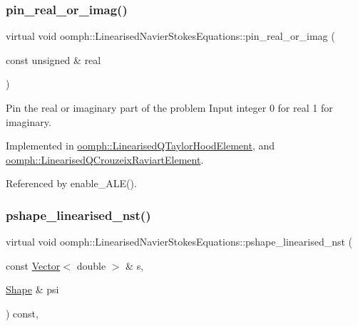 \subsubsection{\texorpdfstring{pin\+\_\+real\+\_\+or\+\_\+imag()}{pin\_real\_or\_imag()}}
{\footnotesize\ttfamily virtual void oomph\+::\+Linearised\+Navier\+Stokes\+Equations\+::pin\+\_\+real\+\_\+or\+\_\+imag (\begin{DoxyParamCaption}\item[{const unsigned \&}]{real }\end{DoxyParamCaption})\hspace{0.3cm}{\ttfamily [pure virtual]}}



Pin the real or imaginary part of the problem Input integer 0 for real 1 for imaginary. 



Implemented in \hyperlink{classoomph_1_1LinearisedQTaylorHoodElement_a84bb4ee14849c6ed91b0005b1c9b06dc}{oomph\+::\+Linearised\+Q\+Taylor\+Hood\+Element}, and \hyperlink{classoomph_1_1LinearisedQCrouzeixRaviartElement_ab6ffe74e04be87be8e1fdf6a58215edb}{oomph\+::\+Linearised\+Q\+Crouzeix\+Raviart\+Element}.



Referenced by enable\+\_\+\+A\+L\+E().

\mbox{\label{classoomph_1_1LinearisedNavierStokesEquations_a6158d0cdb646491170e4b75abfc88538}} 
\subsubsection{\texorpdfstring{pshape\+\_\+linearised\+\_\+nst()}{pshape\_linearised\_nst()}\hspace{0.1cm}{\footnotesize\ttfamily [1/2]}}
{\footnotesize\ttfamily virtual void oomph\+::\+Linearised\+Navier\+Stokes\+Equations\+::pshape\+\_\+linearised\+\_\+nst (\begin{DoxyParamCaption}\item[{const \hyperlink{classoomph_1_1Vector}{Vector}$<$ double $>$ \&}]{s,  }\item[{\hyperlink{classoomph_1_1Shape}{Shape} \&}]{psi }\end{DoxyParamCaption}) const\hspace{0.3cm}{\ttfamily [protected]}, {}}



